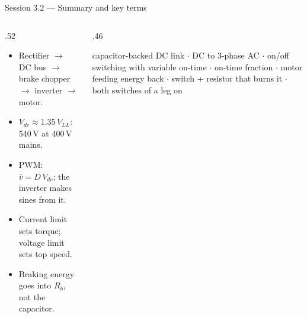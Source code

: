 \documentclass[aspectratio=169,10pt]{beamer}
\begin{document}
\begin{frame}{Session 3.2 --- Summary and key terms}
\begin{columns}[T]
\begin{column}{.52\textwidth}
\begin{keybox}
\begin{itemize}\setlength\itemsep{.3mm}
\item Rectifier $\rightarrow$ DC bus $\rightarrow$ brake chopper $\rightarrow$ inverter $\rightarrow$ motor.
\item $V_{dc}\approx1.35\,V_{LL}$: 540\,V at 400\,V mains.
\item PWM: $\bar v=D\,V_{dc}$; the inverter makes sines from it.
\item Current limit sets torque; voltage limit sets top speed.
\item Braking energy goes into $R_b$, not the capacitor.
\end{itemize}
\end{keybox}
\end{column}
\begin{column}{.46\textwidth}
\begin{defbox}
\small
{} capacitor-backed DC link $\cdot$  DC to 3-phase AC $\cdot$  on/off switching with variable on-time $\cdot$  on-time fraction $\cdot$  motor feeding energy back $\cdot$  switch + resistor that burns it $\cdot$  both switches of a leg on
\end{defbox}
\end{column}
\end{columns}
\end{frame}

\end{document}
